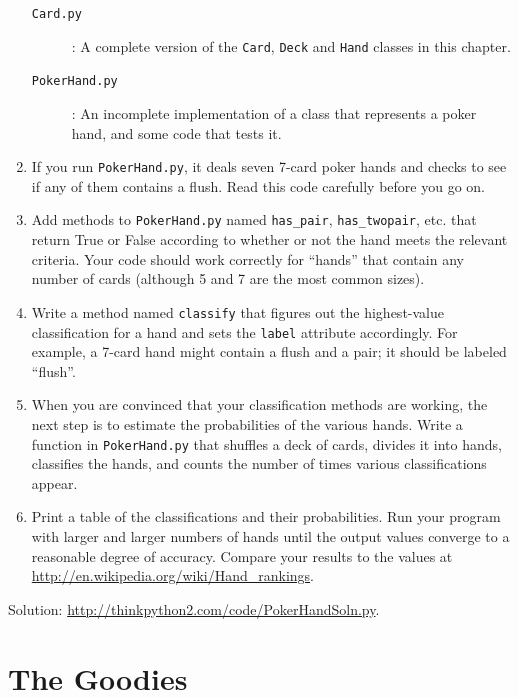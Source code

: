 \documentclass[10pt]{book}
\begin{document}
\begin{exercise}
\begin{enumerate}
\begin{description}
\item[{\tt Card.py}]: A complete version of the {\tt Card},
{\tt Deck} and {\tt Hand} classes in this chapter.

\item[{\tt PokerHand.py}]: An incomplete implementation of a class
that represents a poker hand, and some code that tests it.

\end{description}
%
\item If you run {\tt PokerHand.py}, it deals seven 7-card poker hands
and checks to see if any of them contains a flush.  Read this
code carefully before you go on.

\item Add methods to {\tt PokerHand.py} named \verb"has_pair",
\verb"has_twopair", etc. that return True or False according to
whether or not the hand meets the relevant criteria.  Your code should
work correctly for ``hands'' that contain any number of cards
(although 5 and 7 are the most common sizes).

\item Write a method named {\tt classify} that figures out
the highest-value classification for a hand and sets the
{\tt label} attribute accordingly.  For example, a 7-card hand
might contain a flush and a pair; it should be labeled ``flush''.

\item When you are convinced that your classification methods are
working, the next step is to estimate the probabilities of the various
hands.  Write a function in {\tt PokerHand.py} that shuffles a deck of
cards, divides it into hands, classifies the hands, and counts the
number of times various classifications appear.

\item Print a table of the classifications and their probabilities.
Run your program with larger and larger numbers of hands until the
output values converge to a reasonable degree of accuracy.  Compare
your results to the values at \url{http://en.wikipedia.org/wiki/Hand_rankings}.

\end{enumerate}

Solution: \url{http://thinkpython2.com/code/PokerHandSoln.py}.
\end{exercise}


\chapter{The Goodies}
\end{document}
